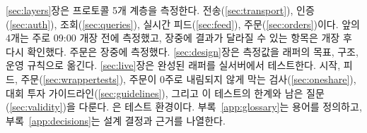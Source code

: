 \ref{sec:layers}장은 프로토콜 5개 계층을 측정한다. 전송(\ref{sec:transport}), 인증(\ref{sec:auth}), 조회(\ref{sec:queries}), 실시간 피드(\ref{sec:feed}), 주문(\ref{sec:orders})이다. 앞의 4개는 주로 09:00 개장 전에 측정했고, 장중에 결과가 달라질 수 있는 항목은 개장 후 다시 확인했다. 주문은 장중에 측정했다. \ref{sec:design}장은 측정값을 래퍼의 목표, 구조, 운영 규칙으로 옮긴다. \ref{sec:live}장은 완성된 래퍼를 실서버에서 테스트한다. 시작, 피드, 주문(\ref{sec:wrappertests}), 주문이 0주로 내림되지 않게 막는 검사(\ref{sec:oneshare}), 대회 투자 가이드라인(\ref{sec:guidelines}), 그리고 이 테스트의 한계와 남은 질문(\ref{sec:validity})을 다룬다. 은 테스트 환경이다. 부록~\ref{app:glossary}는 용어를 정의하고, 부록~\ref{app:decisions}는 설계 결정과 근거를 나열한다.


